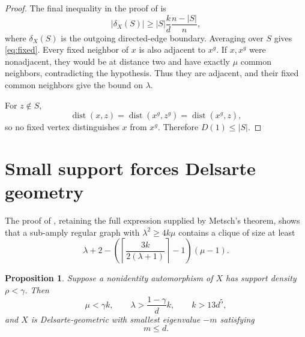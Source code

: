 \documentclass[11pt]{amsart}
\newtheorem{proposition}[theorem]{Proposition}
\theoremstyle{definition}
\newcommand{\dist}{\operatorname{dist}}
\newcommand{\gam}{\gamma}
\begin{document}
\begin{proof}
The final inequality in the proof of \cite[Proposition 2.8]{PS} is
\[
 |\delta_X(S)|\ge |S|\frac{k}{d}\frac{n-|S|}{n},
\]
where $\delta_X(S)$ is the outgoing directed-edge boundary.  Averaging over $S$ gives \eqref{eq:fixed}.  Every fixed neighbor of $x$ is also adjacent to $x^g$.  If $x,x^g$ were nonadjacent, they would be at distance two and have exactly $\mu$ common neighbors, contradicting the hypothesis.  Thus they are adjacent, and their fixed common neighbors give the bound on $\lambda$.

For $z\notin S$,
\[
 \dist(x,z)=\dist(x^g,z^g)=\dist(x^g,z),
\]
so no fixed vertex distinguishes $x$ from $x^g$.  Therefore $D(1)\le|S|$.
\end{proof}

\section{Small support forces Delsarte geometry}
The proof of \cite[Proposition 2.6]{PS}, retaining the full expression supplied by Metsch's theorem, shows that a sub-amply regular graph with $\lambda^2\ge4k\mu$ contains a clique of size at least
\begin{equation}\label{eq:metsch}
 \lambda+2-
 \left(\left\lceil\frac{3k}{2(\lambda+1)}\right\rceil-1\right)(\mu-1).
\end{equation}

\begin{proposition}\label{prop:structure}
Suppose a nonidentity automorphism of $X$ has support density $\rho<\gam$.  Then
\begin{equation}\label{eq:structdata}
 \mu<\gam k,
 \qquad
 \lambda>\frac{1-\gam}{d}k,
 \qquad
 k>13d^5,
\end{equation}
and $X$ is Delsarte-geometric with smallest eigenvalue $-m$ satisfying
\begin{equation}\label{eq:mleqd}
 m\le d.
\end{equation}
\end{proposition}
\end{document}
